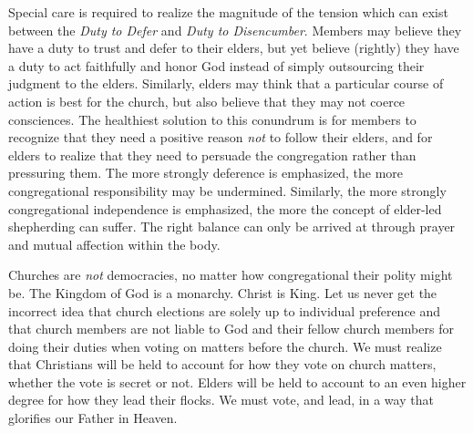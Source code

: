 Special care is required to realize the magnitude of the tension which can exist between the \textit{Duty to Defer} and \textit{Duty to Disencumber}.  Members may believe they have a duty to trust and defer to their elders, but yet believe (rightly) they have a duty to act faithfully and honor God instead of simply outsourcing their judgment to the elders.  Similarly, elders may think that a particular course of action is best for the church, but also believe that they may not coerce consciences.  The healthiest solution to this conundrum is for members to recognize that they need a positive reason \textit{not} to follow their elders, and for elders to realize that they need to persuade the congregation rather than pressuring them.  The more strongly deference is emphasized, the more congregational responsibility may be undermined.  Similarly, the more strongly congregational independence is emphasized, the more the concept of elder-led shepherding can suffer.  The right balance can only be arrived at through prayer and mutual affection within the body.

Churches are \textit{not} democracies, no matter how congregational their polity might be.  The Kingdom of God is a monarchy.  Christ is King.  Let us never get the incorrect idea that church elections are solely up to individual preference and that church members are not liable to God and their fellow church members for doing their duties when voting on matters before the church.  We must realize that Christians will be held to account for how they vote on church matters, whether the vote is secret or not.  Elders will be held to account to an even higher degree for how they lead their flocks.  We must vote, and lead, in a way that glorifies our Father in Heaven. 

